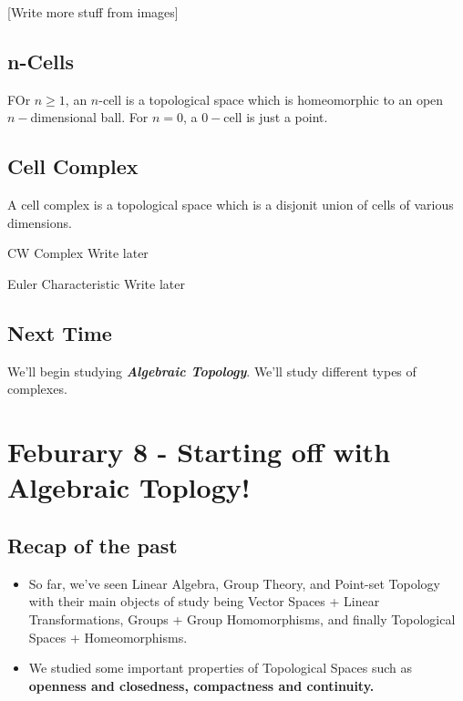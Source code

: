 \documentclass{article}
\begin{document}
\vskip 0.5cm
[Write more stuff from images]

\vskip 0.5cm
\subsection*{n-Cells}
FOr $n \geq 1$, an $n$-cell is a topological space which is homeomorphic to an open $n-$dimensional ball. For $n = 0$, a $0-$cell is just a point.


\vskip 0.5cm
\subsection{Cell Complex}
\begin{mathdefinitionbox}{}
  A cell complex is a topological space which is a disjonit union of cells of various dimensions.
\end{mathdefinitionbox}

\begin{mathdefinitionbox}{CW Complex}
  \vskip 0.5cm
  Write later
\end{mathdefinitionbox}

\begin{mathdefinitionbox}{Euler Characteristic}
  \vskip 0.25cm
  Write later
\end{mathdefinitionbox}

\subsection{Next Time}
We'll begin studying \emph{\textbf{Algebraic Topology}}. We'll study different types of complexes.

\pagebreak

\section{Feburary 8 - Starting off with Algebraic Toplogy!}

\vskip 0.5cm
\subsection{Recap of the past}

\vskip 0.5cm
\begin{itemize}
  \item So far, we've seen Linear Algebra, Group Theory, and Point-set Topology with their main objects of study being Vector Spaces + Linear Transformations, Groups + Group Homomorphisms, and finally Topological Spaces + Homeomorphisms.
  \item We studied some important properties of Topological Spaces such as \textbf{openness and closedness, compactness and continuity.}
\end{itemize}
\end{document}
